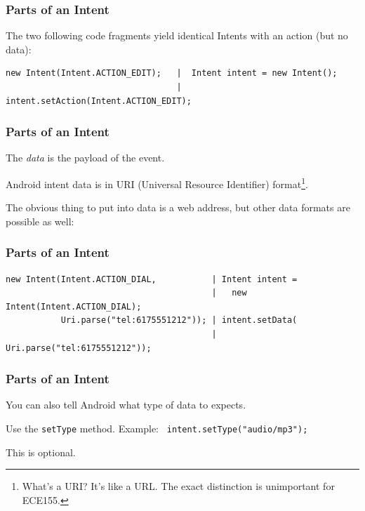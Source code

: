 \begin{frame}[fragile]
\frametitle{Parts of an Intent}
\begin{changemargin}{1cm}

The two following code fragments yield identical Intents with an action (but no data):

\end{changemargin}
{\scriptsize
\begin{verbatim}
new Intent(Intent.ACTION_EDIT);   |  Intent intent = new Intent();
                                  |  intent.setAction(Intent.ACTION_EDIT);
\end{verbatim}
}



\end{frame}


\begin{frame}
\frametitle{Parts of an Intent}
\begin{changemargin}{1cm}

The \emph{data} is the payload of the event. 

Android intent data is in
URI (Universal Resource Identifier) format\footnote{What's a URI? It's
  like a URL. The exact distinction is unimportant for ECE155.}. 
  
  The
obvious thing to put into data is a web address, but other data formats
are possible as well:

\end{changemargin}
\end{frame}


\begin{frame}[fragile]
\frametitle{Parts of an Intent}
{\scriptsize
\begin{verbatim}
new Intent(Intent.ACTION_DIAL,           | Intent intent = 
                                         |   new Intent(Intent.ACTION_DIAL);
           Uri.parse("tel:6175551212")); | intent.setData(
                                         |   Uri.parse("tel:6175551212"));
\end{verbatim}
}
\end{frame}


\begin{frame}
\frametitle{Parts of an Intent}
\begin{changemargin}{1cm}

You can also tell Android what type of data to expects.

Use the {\tt setType} method. Example: {\tt
  intent.setType("audio/mp3");}

This is optional. 


\end{changemargin}
\end{frame}



